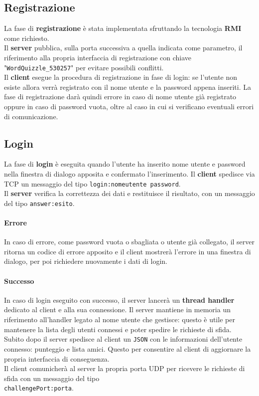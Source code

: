 \documentclass[10pt]{article}
\begin{document}
{\subsection{Registrazione}
La fase di \textbf{registrazione} è stata implementata sfruttando la tecnologia \textbf{RMI} come richiesto.\\Il \textbf{server} pubblica, sulla porta successiva a quella indicata come parametro, il riferimento alla propria interfaccia di registrazione con chiave "\texttt{WordQuizzle\_530257}" per evitare possibili conflitti.\\
Il \textbf{client} esegue la procedura di registrazione in fase di login: se l'utente non esiste allora verrà registrato con il nome utente e la password appena inseriti. La fase di registrazione darà quindi errore in caso di nome utente già registrato oppure in caso di password vuota, oltre al caso in cui si verificano eventuali errori di comunicazione.

\subsection{Login}
La fase di \textbf{login} è eseguita quando l'utente ha inserito nome utente e password nella finestra di dialogo apposita e confermato l'inserimento. Il \textbf{client} spedisce via TCP un messaggio del tipo \texttt{login:nomeutente password}.\\
Il \textbf{server} verifica la correttezza dei dati e restituisce il risultato, con un messaggio del tipo \texttt{answer:esito}.
\paragraph{Errore} In caso di errore, come password vuota o sbagliata o utente già collegato, il server ritorna un codice di errore apposito e il client mostrerà l'errore in una finestra di dialogo, per poi richiedere nuovamente i dati di login.
\paragraph{Successo} In caso di login eseguito con successo, il server lancerà un \textbf{thread handler} dedicato al client e alla sua connessione. Il server mantiene in memoria un riferimento all'handler legato al nome utente che gestisce: questo è utile per mantenere la lista degli utenti connessi e poter spedire le richieste di sfida.\\
Subito dopo il server spedisce al client un \texttt{JSON} con le informazioni dell'utente connesso: punteggio e lista amici. Questo per consentire al client di aggiornare la propria interfaccia di conseguenza.\\
Il client comunicherà al server la propria porta UDP per ricevere le richieste di sfida con un messaggio del tipo\\\texttt{challengePort:porta}.

}
\end{document}
